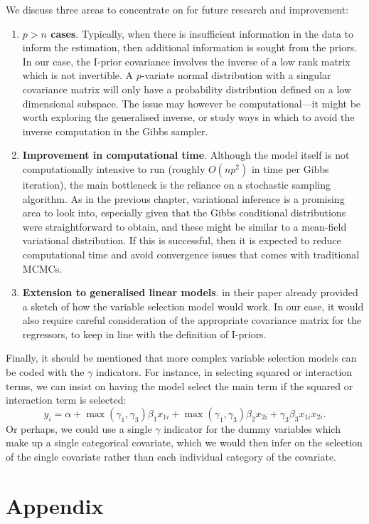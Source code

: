 \documentclass[a4paper,showframe,11pt]{report}
\begin{document}
We discuss three areas to concentrate on for future research and improvement:
\begin{enumerate}
  \item \textbf{\boldmath$p>n$ cases}. 
  Typically, when there is insufficient information in the data to inform the estimation, then additional information is sought from the priors. 
  In our case, the I-prior covariance involves the inverse of a low rank matrix which is not invertible.
  A $p$-variate normal distribution with a singular covariance matrix will only have a probability distribution defined on a low dimensional subspace.
  The issue may however be computational---it might be worth exploring the generalised inverse, or study ways in which to avoid the inverse computation in the Gibbs sampler.
  
  \item \textbf{Improvement in computational time}. 
  Although the model itself is not computationally intensive to run (roughly $O(np^2)$ in time per Gibbs iteration), the main bottleneck is the reliance on a stochastic sampling algorithm.
  As in the previous chapter, variational inference is a promising area to look into, especially given that the Gibbs conditional distributions were straightforward to obtain, and these might be similar to a mean-field variational distribution.
  If this is successful, then it is expected to reduce computational time and avoid convergence issues that comes with traditional MCMCs.
  
  \item \textbf{Extension to generalised linear models}.
  \citet{Kuo1998} in their paper already provided a sketch of how the variable selection model would work.
  In our case, it would also require careful consideration of the appropriate covariance matrix for the regressors, to keep in line with the definition of I-priors.
\end{enumerate}

Finally, it should be mentioned that more complex variable selection models can be coded with the $\gamma$ indicators.
For instance, in selecting squared or interaction terms, we can insist on having the model select the main term if the squared or interaction term is selected:
\[
  y_i = \alpha + \max(\gamma_1,\gamma_3) \beta_1x_{1i} + \max(\gamma_1,\gamma_3) \beta_2 x_{2i} + \gamma_3 \beta_3 x_{1i}x_{2i}.
\]
Or perhaps, we could use a single $\gamma$ indicator for the dummy variables which make up a single categorical covariate, which we would then infer on the selection of the single covariate rather than each individual category of the covariate.

%

\ifstandalone
  \section*{Appendix}
  
  
  
\fi

\hClosingStuffStandalone
\end{document}
